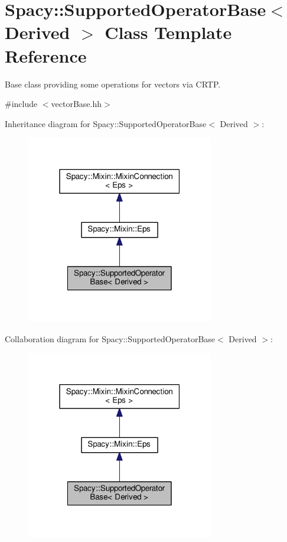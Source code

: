 \hypertarget{classSpacy_1_1SupportedOperatorBase}{}\section{Spacy\+:\+:Supported\+Operator\+Base$<$ Derived $>$ Class Template Reference}
\label{classSpacy_1_1SupportedOperatorBase}


Base class providing some operations for vectors via C\+R\+T\+P.  




{\ttfamily \#include $<$vector\+Base.\+hh$>$}



Inheritance diagram for Spacy\+:\+:Supported\+Operator\+Base$<$ Derived $>$\+:\nopagebreak
\begin{figure}[H]
\begin{center}
\leavevmode
\includegraphics[width=232pt]{classSpacy_1_1SupportedOperatorBase__inherit__graph}
\end{center}
\end{figure}


Collaboration diagram for Spacy\+:\+:Supported\+Operator\+Base$<$ Derived $>$\+:\nopagebreak
\begin{figure}[H]
\begin{center}
\leavevmode
\includegraphics[width=232pt]{classSpacy_1_1SupportedOperatorBase__coll__graph}
\end{center}
\end{figure}
